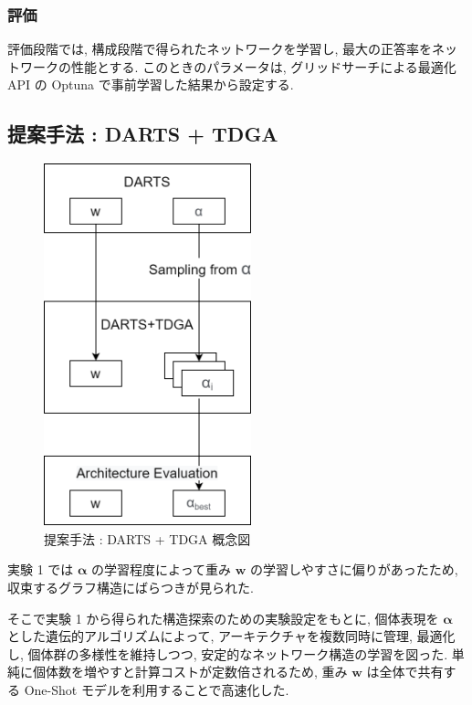\subsubsection{評価}
評価段階では, 構成段階で得られたネットワークを学習し,
最大の正答率をネットワークの性能とする.
このときのパラメータは, グリッドサーチによる最適化 API の Optuna \cite{akiba2019optuna}
で事前学習した結果から設定する.




\clearpage\newpage
\changeindent{0cm}
\subsection{提案手法 : DARTS + TDGA}
\label{sec:pred.02}
\changeindent{2cm}

\begin{figure}[t]
  \begin{center}
    \includegraphics[clip,width=6cm]{./fig/03.pred/datdga.png}
  \end{center}
  \caption{提案手法 : DARTS + TDGA 概念図}
  \label{fig:image_ga}
\end{figure}

実験 1 では $\bm{\alpha}$ の学習程度によって重み $\bm{w}$ の学習しやすさに偏りがあったため,
収束するグラフ構造にばらつきが見られた.

そこで実験 1 から得られた構造探索のための実験設定をもとに,
個体表現を $\bm{\alpha}$ とした遺伝的アルゴリズムによって,
アーキテクチャを複数同時に管理, 最適化し,
個体群の多様性を維持しつつ, 安定的なネットワーク構造の学習を図った.
単純に個体数を増やすと計算コストが定数倍されるため,
重み $\bm{w}$ は全体で共有する One-Shot モデル\cite{sinha2020evolving}を利用することで高速化した.


